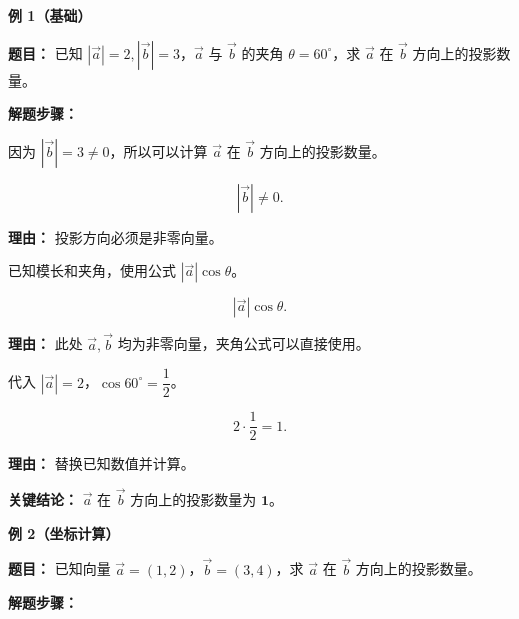 \begin{examplebox}

	\textbf{\textcolor{CExample}{例 1（基础）}}

	\textbf{\textcolor{CExample}{题目：}} 已知 $|\vec a|=2, |\vec b|=3$，$\vec a$ 与 $\vec b$ 的夹角 $\theta = 60^\circ$，求 $\vec a$ 在 $\vec b$ 方向上的投影数量。

	\textbf{\textcolor{CExample}{解题步骤：}}

	\begin{description}[style=nextline, leftmargin=2.8em, labelsep=0.5em, itemsep=0.45em]

		\item[\textbf{第一步（检查条件）：}] 因为 $|\vec b|=3\neq 0$，所以可以计算 $\vec a$ 在 $\vec b$ 方向上的投影数量。

		      \[
			      |\vec b|\neq 0.
		      \]

		      \par\textbf{理由：}
		      投影方向必须是非零向量。


		\item[\textbf{第二步（选用公式）：}] 已知模长和夹角，使用公式 $|\vec a|\cos\theta$。

		      \[
			      |\vec a|\cos\theta .
		      \]

		      \par\textbf{理由：}
		      此处 $\vec a,\vec b$ 均为非零向量，夹角公式可以直接使用。


		\item[\textbf{第三步（代入数据）：}] 代入 $|\vec a|=2$，$\cos60^\circ=\dfrac12$。

		      \[
			      2 \cdot \frac12 = 1 .
		      \]

		      \par\textbf{理由：}
		      替换已知数值并计算。

	\end{description}

	\textbf{\textcolor{CExample}{关键结论：}} $\vec a$ 在 $\vec b$ 方向上的投影数量为 $\mathbf{1}$。

	\medskip

	\textbf{\textcolor{CExample}{例 2（坐标计算）}}

	\textbf{\textcolor{CExample}{题目：}} 已知向量 $\vec a=(1,2)$，$\vec b=(3,4)$，求 $\vec a$ 在 $\vec b$ 方向上的投影数量。

	\textbf{\textcolor{CExample}{解题步骤：}}

	\begin{description}[style=nextline, leftmargin=2.8em, labelsep=0.5em, itemsep=0.45em]


\end{description}
\end{examplebox}
